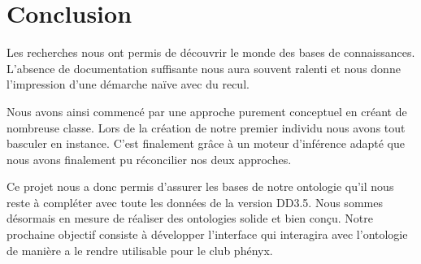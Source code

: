 

\section{Conclusion}

\par Les recherches nous ont permis de découvrir le monde des bases de connaissances. L'absence de documentation suffisante nous aura souvent ralenti et nous donne l'impression d'une démarche naïve avec du recul.
\par Nous avons ainsi commencé par une approche purement conceptuel en créant de nombreuse classe. Lors de la création de notre premier individu nous avons tout basculer en instance. C'est finalement grâce à un moteur d'inférence adapté que nous avons finalement pu réconcilier nos deux approches.
\par Ce projet nous a donc permis d'assurer les bases de notre ontologie qu'il nous reste à compléter avec toute les données de la version DD3.5. Nous sommes désormais en mesure de réaliser des ontologies solide et bien conçu. Notre prochaine objectif consiste à développer l'interface qui interagira avec l'ontologie de manière a le rendre utilisable pour le club phényx.
